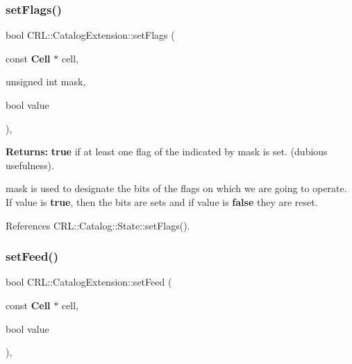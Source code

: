 \mbox{\label{classCRL_1_1CatalogExtension_ab9475735032d500f4d4a8cf980864b3e}} 
\subsubsection{\texorpdfstring{set\+Flags()}{setFlags()}}
{\footnotesize\ttfamily bool C\+R\+L\+::\+Catalog\+Extension\+::set\+Flags (\begin{DoxyParamCaption}\item[{const \textbf{ Cell} $\ast$}]{cell,  }\item[{unsigned int}]{mask,  }\item[{bool}]{value }\end{DoxyParamCaption})\hspace{0.3cm}{\ttfamily [inline]}, {\ttfamily [static]}}

{\bfseries Returns\+:} {\bfseries true} if at least one flag of the indicated by mask is set. (dubious usefulness).

{\ttfamily mask} is used to designate the bits of the flags on which we are going to operate. If {\ttfamily value} is {\bfseries true}, then the bits are sets and if {\ttfamily value} is {\bfseries false} they are reset. 

References C\+R\+L\+::\+Catalog\+::\+State\+::set\+Flags().

\mbox{\label{classCRL_1_1CatalogExtension_ab82e4b139ca636feaca5d97836891b68}} 
\subsubsection{\texorpdfstring{set\+Feed()}{setFeed()}}
{\footnotesize\ttfamily bool C\+R\+L\+::\+Catalog\+Extension\+::set\+Feed (\begin{DoxyParamCaption}\item[{const \textbf{ Cell} $\ast$}]{cell,  }\item[{bool}]{value }\end{DoxyParamCaption})\hspace{0.3cm}{\ttfamily [inline]}, {\ttfamily [static]}}

